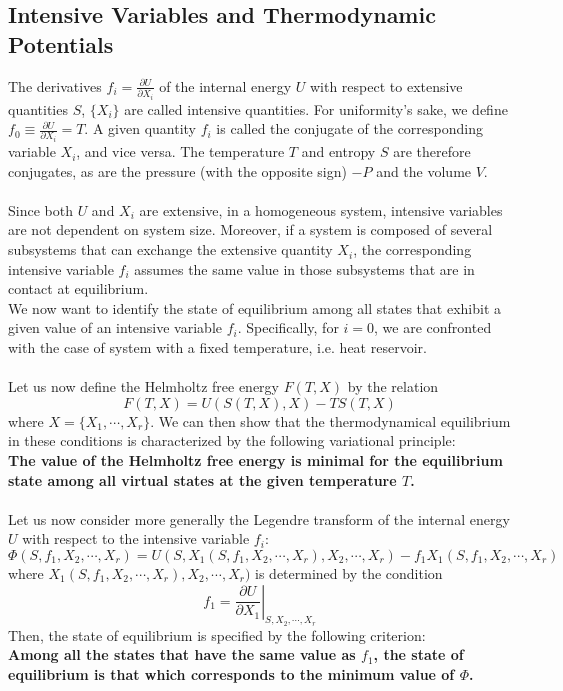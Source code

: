 \documentclass[cyan]{elegantnote}
\begin{document}
\subsection{Intensive Variables and Thermodynamic Potentials}
The derivatives $f_i = \frac{\partial U}{\partial X_i}$ of the internal energy $U$ with respect to extensive quantities $S$, $\{X_i\}$ are called intensive quantities. For uniformity's sake, we define $f_0 \equiv \frac{\partial U}{\partial X_i} = T$. A given quantity $f_i$ is called the conjugate of the corresponding variable $X_i$, and vice versa. The temperature $T$ and entropy $S$ are therefore conjugates, as are the pressure (with the opposite sign) $-P$ and the volume $V$.
\\ \\
Since both $U$ and $X_i$ are extensive, in a homogeneous system, intensive variables are not dependent on system size. Moreover, if a system is composed of several subsystems that can exchange the extensive quantity $X_i$, the corresponding intensive variable $f_i$ assumes the same value in those subsystems that are in contact at equilibrium.
\\
We now want to identify the state of equilibrium among all states that exhibit a given value of an intensive variable $f_i$. Specifically, for $i = 0$, we are confronted with the case of system with a fixed temperature, i.e. heat reservoir.
\\ \\
Let us now define the Helmholtz free energy $F(T,X) $ by the relation
\[F(T,X) = U(S(T,X),X) - TS(T,X)\]
where $X = \{ X_1,\cdots,X_r\}$.
We can then show that the thermodynamical equilibrium in these conditions is characterized by the following variational principle:
\\
\textbf{The value of the Helmholtz free energy is minimal for the equilibrium state among all virtual states at the given temperature $T$.}
\\ \\
Let us now consider more generally the Legendre transform of the internal energy $U$ with respect to the intensive variable $f_i$:
\[\Phi(S,f_1,X_2,\cdots,X_r) = U(S,X_1(S,f_1,X_2,\cdots,X_r),X_2,\cdots,X_r) - f_1 X_1 (S,f_1,X_2,\cdots,X_r)\]
where $X_1(S,f_1,X_2,\cdots,X_r),X_2,\cdots,X_r)$ is determined by the condition
\[f_1 =\left. \frac{\partial U}{\partial X_1} \right |_{S,X_2,\cdots,X_r}\]
Then, the state of equilibrium is specified by the following criterion:
\\
\textbf{Among all the states that have the same value as $f_1$, the state of equilibrium is that which corresponds to the minimum value of $\Phi$.}
\end{document}
